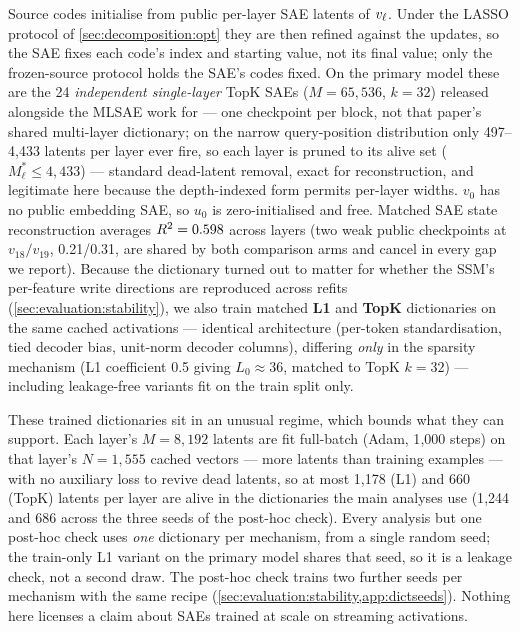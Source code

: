 Source codes initialise from public per-layer SAE latents of $v_\ell$. Under
the LASSO protocol of \cref{sec:decomposition:opt} they are then refined
against the updates, so the SAE fixes each code's index and starting value,
not its final value; only the frozen-source protocol holds the SAE's codes
fixed. On the
primary model these are the 24 \emph{independent single-layer} TopK SAEs
($M = 65{,}536$, $k{=}32$) released alongside the MLSAE work for \pythia{}
\citep{lawson2025mlsae} --- one checkpoint per block, not that paper's shared
multi-layer dictionary; on the
narrow query-position distribution only 497--4{,}433 latents per layer ever
fire, so each layer is pruned to its alive set ($M^*_\ell \le 4{,}433$) ---
standard dead-latent removal, exact for reconstruction, and legitimate here
because the depth-indexed form permits per-layer widths. $v_0$ has no public
embedding SAE, so $u_0$ is zero-initialised and free. Matched SAE state
reconstruction averages $R^2 = 0.598$ across layers (two weak public
checkpoints at $v_{18}/v_{19}$, 0.21/0.31, are shared by both comparison arms
and cancel in every gap we report). Because the dictionary turned out to
matter for whether the SSM's per-feature write directions are reproduced
across refits (\cref{sec:evaluation:stability}), we also train
matched \textbf{L1} and \textbf{TopK} dictionaries on the same cached
activations --- identical architecture (per-token standardisation, tied
decoder bias, unit-norm decoder columns), differing \emph{only} in the
sparsity mechanism (L1 coefficient 0.5 giving $L_0 \approx 36$, matched to
TopK $k{=}32$) --- including leakage-free variants fit on the train split
only.

These trained dictionaries sit in an unusual regime, which bounds what they
can support. Each layer's $M = 8{,}192$ latents are fit full-batch (Adam,
1{,}000 steps) on that layer's $N = 1{,}555$ cached vectors --- more latents
than training examples --- with no auxiliary loss to revive dead latents, so
at most 1{,}178 (L1) and 660 (TopK) latents per layer are alive in the
dictionaries the main analyses use (1{,}244 and 686 across the three seeds of
the post-hoc check). Every
analysis but one post-hoc check uses \emph{one} dictionary per mechanism,
from a single random seed; the train-only L1 variant on the primary model
shares that seed, so it is a leakage check, not a second draw. The post-hoc
check trains two further seeds per mechanism with the same recipe
(\cref{sec:evaluation:stability,app:dictseeds}). Nothing here licenses a
claim about SAEs trained at scale on streaming activations.

